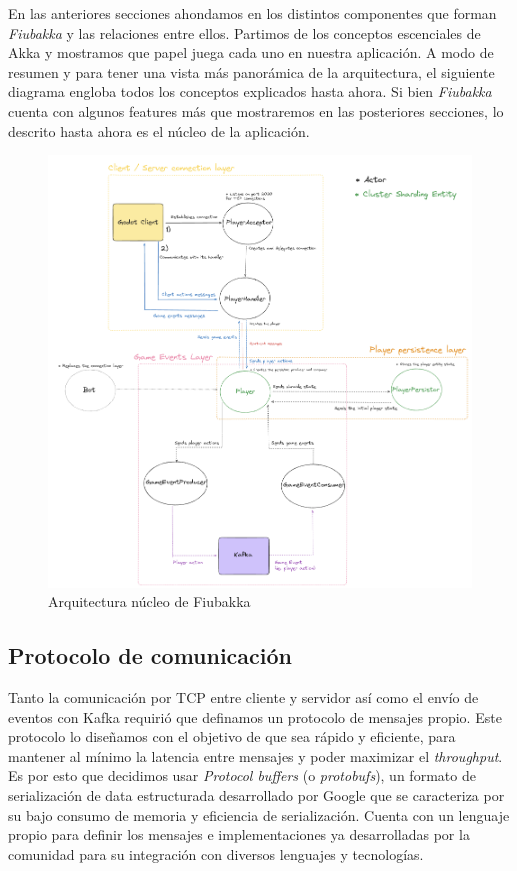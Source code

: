 \noindent En las anteriores secciones ahondamos en los distintos componentes que forman \textit{Fiubakka} y las relaciones entre ellos. Partimos de los conceptos escenciales
de Akka y mostramos que papel juega cada uno en nuestra aplicación. A modo de resumen y para tener una vista más panorámica de la arquitectura, el siguiente diagrama engloba
todos los conceptos explicados hasta ahora. Si bien \textit{Fiubakka} cuenta con algunos features más que mostraremos en las posteriores secciones, lo descrito hasta ahora es el
núcleo de la aplicación.

\begin{figure}[htbp]
    \centering
    \includegraphics[width=1\textwidth]{../assets/fiubakka-architecture.png}
    \caption{Arquitectura núcleo de Fiubakka}
\end{figure}

\newpage

\subsection{Protocolo de comunicación}

\noindent Tanto la comunicación por TCP entre cliente y servidor así como el envío de eventos con Kafka
requirió que definamos un protocolo de mensajes propio. Este protocolo lo diseñamos con el objetivo de
que sea rápido y eficiente, para mantener al mínimo la latencia entre mensajes y poder maximizar el \textit{throughput}.
Es por esto que decidimos usar \textit{Protocol buffers} (o \textit{protobufs}), un formato de serialización de data estructurada
desarrollado por Google que se caracteriza por su bajo consumo de memoria y eficiencia de serialización.
Cuenta con un lenguaje propio para definir los mensajes e implementaciones ya desarrolladas por la comunidad para su integración
con diversos lenguajes y tecnologías.

